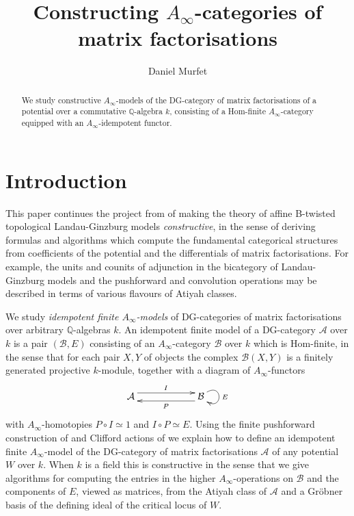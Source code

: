 \documentclass[english,letter paper,12pt,leqno]{article}
\theoremstyle{example}
\numberwithin{equation}{section}
\def\AA{\mathcal{A}}
\def\BB{\mathcal{B}}
\def\res{\operatorname{Res}}
\begin{document}
\def\Res{\res\!}
\newcommand{\ud}{\mathrm{d}}
\newcommand{\Ress}[1]{\res_{#1}\!}
\newcommand{\cat}[1]{\mathcal{#1}}
\newcommand{\lto}{\longrightarrow}
\newcommand{\xlto}[1]{\stackrel{#1}\lto}
\newcommand{\md}[1]{\mathscr{#1}}
\newcommand{\coeff}[1]{\widetilde{#1}}
\def\sus{\l}
\def\l{\,|\,}
\def\sgn{\textup{sgn}}
\def\samp{\zeta}
\def\Samp{Z}
\def\traff{N}

\title{Constructing $A_\infty$-categories of matrix factorisations}
\author{Daniel Murfet}

\maketitle

\begin{abstract}
We study constructive $A_\infty$-models of the DG-category of matrix factorisations of a potential over a commutative $\mathbb{Q}$-algebra $k$, consisting of a Hom-finite $A_\infty$-category equipped with an $A_\infty$-idempotent functor.
\end{abstract}

\tableofcontents

\section{Introduction}

This paper continues the project from \cite{pushforward,cut,lgdual} of making the theory of affine B-twisted topological Landau-Ginzburg models \emph{constructive}, in the sense of deriving formulas and algorithms which compute the fundamental categorical structures from coefficients of the potential and the differentials of matrix factorisations. For example, the units and counits of adjunction in the bicategory of Landau-Ginzburg models \cite{lgdual} and the pushforward and convolution operations \cite{pushforward} may be described in terms of various flavours of Atiyah classes.

We study \emph{idempotent finite $A_\infty$-models} of DG-categories of matrix factorisations over arbitrary $\mathbb{Q}$-algebras $k$. An idempotent finite model of a DG-category $\AA$ over $k$ is a pair $(\mathcal{B}, E)$ consisting of an $A_\infty$-category $\mathcal{B}$ over $k$ which is Hom-finite, in the sense that for each pair $X,Y$ of objects the complex $\mathcal{B}(X,Y)$ is a finitely generated projective $k$-module, together with a diagram of $A_\infty$-functors
\[
\xymatrix@C+3pc{
\AA \ar@<1ex>[r]^I & \mathcal{B} \ar@(ur,dr)^E \ar@<1ex>[l]^P
}
\]
with $A_\infty$-homotopies $P \circ I \simeq 1$ and $I \circ P \simeq E$. Using the finite pushforward construction of \cite{pushforward} and Clifford actions of \cite{cut} we explain how to define an idempotent finite $A_\infty$-model of the DG-category of matrix factorisations $\AA$ of any potential $W$ over $k$. When $k$ is a field this is constructive in the sense that we give algorithms for computing the entries in the higher $A_\infty$-operations on $\BB$ and the components of $E$, viewed as matrices, from the Atiyah class of $\AA$ and a Gr\"obner basis of the defining ideal of the critical locus of $W$.
\end{document}
